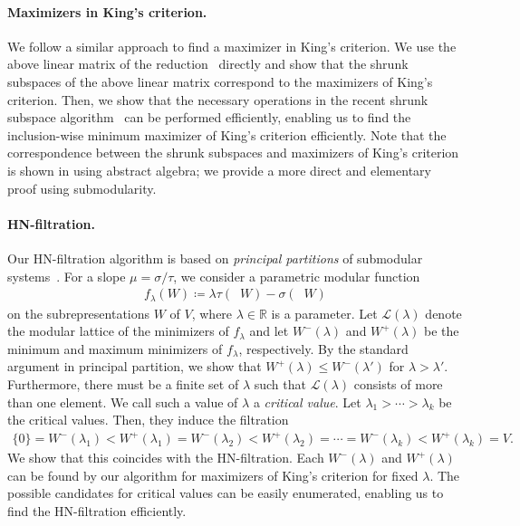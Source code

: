 \documentclass[a4paper,11pt]{article}
\numberwithin{equation}{section}
\newcommand{\R}{\mathbb{R}}
\newcommand{\caL}{\mathcal{L}}
\DeclareMathOperator{\dimv}{\underline{dim}}
\begin{document}
\paragraph{Maximizers in King's criterion.}
We follow a similar approach to find a maximizer in King's criterion.
We use the above linear matrix of the reduction~\cite{Derksen2017} directly and show that the shrunk subspaces of the above linear matrix correspond to the maximizers of King's criterion.
Then, we show that the necessary operations in the recent shrunk subspace algorithm~\citep{Franks2023} can be performed efficiently, enabling us to find the inclusion-wise minimum maximizer of King's criterion efficiently.
Note that the correspondence between the shrunk subspaces and maximizers of King's criterion is shown in \cite{Huszar2021} using abstract algebra; we provide a more direct and elementary proof using submodularity.

\paragraph{HN-filtration.}
Our HN-filtration algorithm is based on \emph{principal partitions} of submodular systems~\cite{Fujishige2009}.
For a slope $\mu = \sigma/\tau$, we consider a parametric modular function 
\begin{align}
    f_\lambda(W) \coloneqq \lambda \tau(\dimv W) - \sigma(\dimv W)
\end{align}
on the subrepresentations $W$ of $V$, where $\lambda \in \R$ is a parameter.
Let $\caL(\lambda)$ denote the modular lattice of the minimizers of $f_\lambda$ and let $W^-(\lambda)$ and $W^+(\lambda)$ be the minimum and maximum minimizers of $f_\lambda$, respectively.
By the standard argument in principal partition, we show that $W^+(\lambda) \leq W^-(\lambda')$ for $\lambda > \lambda'$.
Furthermore, there must be a finite set of $\lambda$ such that $\caL(\lambda)$ consists of more than one element.
We call such a value of $\lambda$ a \emph{critical value}.
Let $\lambda_1 > \cdots > \lambda_k$ be the critical values.
Then, they induce the filtration
\begin{align}
    \{0\} = W^-(\lambda_1) < W^+(\lambda_1) = W^-(\lambda_2) < W^+(\lambda_2) =  \cdots = W^-(\lambda_k) < W^+(\lambda_k) = V.
\end{align}
We show that this coincides with the HN-filtration.
Each $W^-(\lambda)$ and $W^+(\lambda)$ can be found by our algorithm for maximizers of King's criterion for fixed $\lambda$. 
The possible candidates for critical values can be easily enumerated, enabling us to find the HN-filtration efficiently.
\end{document}
